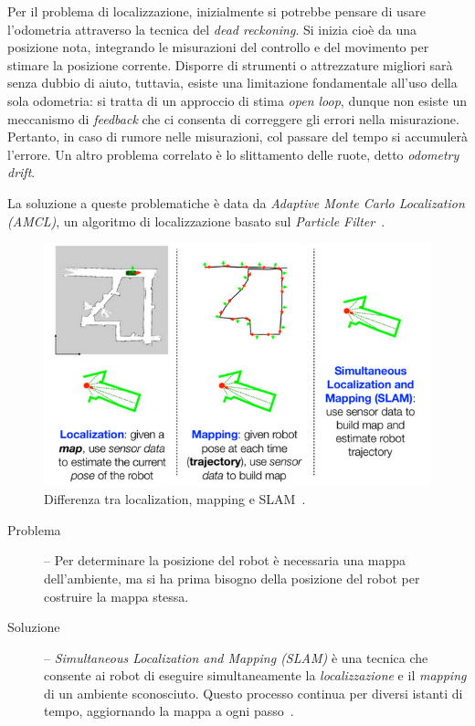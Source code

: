 Per il problema di localizzazione, inizialmente si potrebbe pensare di usare 
l'odometria attraverso la tecnica del \textit{dead reckoning}. Si inizia 
cioè da una posizione nota, integrando le misurazioni del controllo e del movimento per stimare la posizione corrente.
Disporre di strumenti o attrezzature migliori sarà senza dubbio di aiuto, tuttavia, esiste
una limitazione fondamentale all’uso della sola odometria: si tratta di un approccio di stima 
\textit{open loop}, dunque non esiste un meccanismo di \textit{feedback} che ci consenta di 
correggere gli errori nella misurazione.
Pertanto, in caso di rumore nelle misurazioni, col passare del tempo si accumulerà l'errore.
Un altro problema correlato è lo slittamento delle ruote, detto \textit{odometry drift}.

La soluzione a queste problematiche è data da \textit{Adaptive Monte Carlo Localization (AMCL)},
un algoritmo di localizzazione basato sul \textit{Particle Filter}~\cite{f1tenthcoursel08}.

\begin{figure}[ht]
    \centering
    \includegraphics[width=\textwidth]{images/perception.png}
    \caption{Differenza tra localization, mapping e SLAM~\cite{f1tenthcoursel09}.}
    \label{fig:fig5} %
\end{figure}

\begin{description}
    \item[Problema] -- Per determinare la posizione del robot è necessaria una mappa 
    dell’ambiente, ma si ha prima bisogno della posizione del robot per costruire la mappa stessa.
    \item[Soluzione] -- \textit{Simultaneous Localization and Mapping (SLAM)} è una tecnica che 
    consente ai robot di eseguire simultaneamente la \textit{localizzazione} e il 
    \textit{mapping} di un ambiente sconosciuto. Questo processo continua per diversi istanti 
    di tempo, aggiornando la mappa a ogni passo~\cite{f1tenthcoursel09}.
\end{description}


